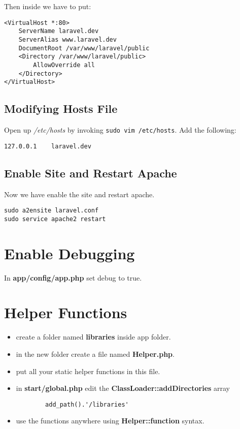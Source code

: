 \documentclass[a4paper, 10pt]{article}
\begin{document}
Then inside we have to put:
\begin{verbatim}
<VirtualHost *:80>
    ServerName laravel.dev
    ServerAlias www.laravel.dev
    DocumentRoot /var/www/laravel/public
    <Directory /var/www/laravel/public>
        AllowOverride all
    </Directory>
</VirtualHost>
\end{verbatim}
\subsection{Modifying Hosts File}
Open up \emph{/etc/hosts} by invoking \verb|sudo vim /etc/hosts|.
Add the following:
\begin{verbatim}
127.0.0.1    laravel.dev
\end{verbatim}
\subsection{Enable Site and Restart Apache}
Now we have enable the site and restart apache.
\begin{verbatim}
sudo a2ensite laravel.conf
sudo service apache2 restart
\end{verbatim}

\section{Enable Debugging}
In \textbf{app/config/app.php} set debug to true.

\section{Helper Functions}
\begin{itemize}
    \item create a folder named \textbf{libraries} inside app folder.
    \item in the new folder create a file named \textbf{Helper.php}.
    \item put all your static helper functions in this file.
    \item in \textbf{start/global.php} edit the \textbf{ClassLoader::addDirectories} array
        \begin{verbatim}
        add_path().'/libraries'
        \end{verbatim}
    \item use the functions anywhere using \textbf{Helper::function} syntax.
\end{itemize}
\end{document}
